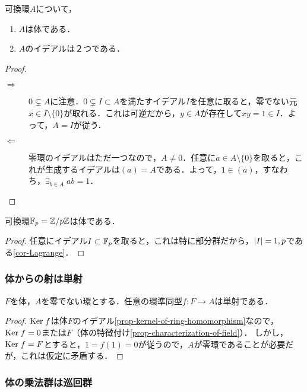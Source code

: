 \documentclass[uplatex,dvipdfmx]{jsreport}
\begin{document}
\begin{proposition}[体の特徴付け]\label{prop-characterization-of-field}
    可換環$A$について，
    \begin{enumerate}
        \item $A$は体である．
        \item $A$のイデアルは２つである．
    \end{enumerate}
\end{proposition}
\begin{proof}\mbox{}
    \begin{description}
        \item[$\Rightarrow$] $0\subsetneq A$に注意．$0\subsetneq I\subset A$を満たすイデアル$I$を任意に取ると，零でない元$x\in I\setminus\{0\}$が取れる．これは可逆だから，$y\in A$が存在して$xy=1\in I$．よって，$A=I$が従う．
        \item[$\Leftarrow$] 零環のイデアルはただ一つなので，$A\ne 0$．任意に$a\in A\setminus\{0\}$を取ると，これが生成するイデアルは$(a)=A$である．よって，$1\in(a)$，すなわち，$\exists_{b\in A}\;ab=1$．
    \end{description}
\end{proof}

\begin{corollary}[体とは素数である]
    可換環$\mathbb{F}_p=\mathbb{Z}/p\mathbb{Z}$は体である．
\end{corollary}
\begin{proof}
    任意にイデアル$I\subset\mathbb{F}_p$を取ると，これは特に部分群だから，$\lvert I\rvert=1,p$である\ref{cor-Lagrange}．
\end{proof}

\subsubsection{体からの射は単射}

\begin{proposition}[体から出る射]\label{prop-morphism-from-fields}
    $F$を体，$A$を零でない環とする．任意の環準同型$f:F\to A$は単射である．
\end{proposition}
\begin{proof}
    $\mathrm{Ker}\; f$は体$F$のイデアル\ref{prop-kernel-of-ring-homomorphism}なので，$\mathrm{Ker}\; f=0$または$F$（体の特徴付け\ref{prop-characterization-of-field}）．
    しかし，$\mathrm{Ker}\; f=F$とすると，$1=f(1)=0$が従うので，$A$が零環であることが必要だが，これは仮定に矛盾する．
\end{proof}

\subsubsection{体の乗法群は巡回群}
\end{document}
